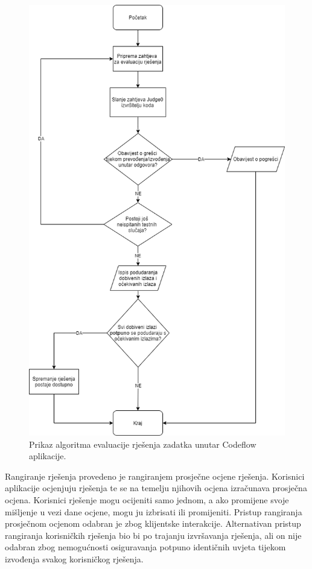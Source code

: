 \documentclass[times, utf8, zavrsni, numeric]{fer}
\begin{document}
	\begin{figure}[H]
		\centering
		\includegraphics[width=\linewidth]{pictures/prikazi/Algorithm.png}
		\caption{Prikaz algoritma evaluacije rješenja zadatka unutar Codeflow aplikacije.}
		\label{fig:algorithm}
	\end{figure}
	Rangiranje rješenja provedeno je rangiranjem prosječne ocjene rješenja. Korisnici aplikacije ocjenjuju rješenja te se na temelju njihovih ocjena izračunava prosječna ocjena. Korisnici rješenje mogu ocijeniti samo jednom, a ako promijene svoje mišljenje u vezi dane ocjene, mogu ju izbrisati ili promijeniti. Pristup rangiranja prosječnom ocjenom odabran je zbog klijentske interakcije. Alternativan pristup rangiranja korisničkih rješenja bio bi po trajanju izvršavanja rješenja, ali on nije odabran zbog nemogućnosti osiguravanja potpuno identičnih uvjeta tijekom izvođenja svakog korisničkog rješenja.
	
\end{document}
